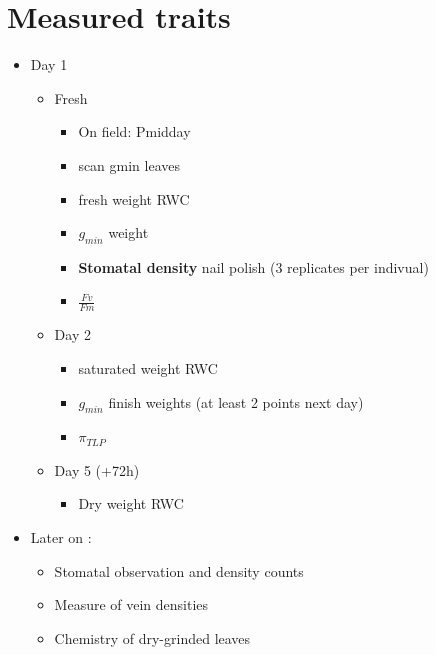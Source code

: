 \documentclass[
]{book}
\providecommand{\tightlist}{%
  \setlength{\itemsep}{0pt}\setlength{\parskip}{0pt}}
\begin{document}
\hypertarget{measured-traits}{%
\section{Measured traits}\label{measured-traits}}

\begin{itemize}
\tightlist
\item
  Day 1

  \begin{itemize}
  \tightlist
  \item
    Fresh

    \begin{itemize}
    \tightlist
    \item
      On field: Pmidday
    \item
      scan gmin leaves
    \item
      fresh weight RWC
    \item
      \textbf{\(g_{min}\)} weight\\
    \item
      \textbf{Stomatal density} nail polish (3 replicates per indivual)
    \item
      \textbf{\(\frac{Fv}{Fm}\)}
    \end{itemize}
  \item
    Day 2

    \begin{itemize}
    \tightlist
    \item
      saturated weight RWC
    \item
      \textbf{\(g_{min}\)} finish weights (at least 2 points next day)
    \item
      \textbf{\(\pi_{TLP}\)}
    \end{itemize}
  \item
    Day 5 (+72h)

    \begin{itemize}
    \tightlist
    \item
      Dry weight RWC
    \end{itemize}
  \end{itemize}
\item
  Later on :

  \begin{itemize}
  \tightlist
  \item
    Stomatal observation and density counts
  \item
    Measure of vein densities
  \item
    Chemistry of dry-grinded leaves
  \end{itemize}
\end{itemize}
\end{document}

